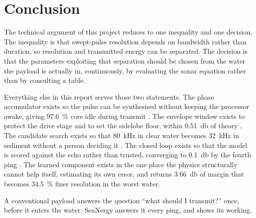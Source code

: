 \documentclass[conference,a4paper]{IEEEtran}
\begin{document}
\section{Conclusion}

The technical argument of this project reduces to one inequality and one
decision. The inequality is that swept-pulse resolution depends on bandwidth
rather than duration, so resolution and transmitted energy can be separated. The
decision is that the parameters exploiting that separation should be chosen from
the water the payload is actually in, continuously, by evaluating the sonar
equation rather than by consulting a table.

Everything else in this report serves those two statements. The phase
accumulator exists so the pulse can be synthesised without keeping the processor
awake, giving \SI{97.6}{\percent} core idle during transmit . The
envelope window exists to protect the drive stage and to set the sidelobe floor,
within \SI{0.51}{\decibel} of theory . The candidate search exists so
that \SI{80}{\kilo\hertz} in clear water becomes \SI{32}{\kilo\hertz} in
sediment without a person deciding it . The closed loop exists so that
the model is scored against the echo rather than trusted, converging to
\SI{0.1}{\decibel} by the fourth ping . The learned component exists
in the one place the physics structurally cannot help itself, estimating its own
error, and returns \SI{3.66}{\decibel} of margin that becomes
\SI{34.5}{\percent} finer resolution in the worst water.

A conventional payload answers the question ``what should I transmit?'' once,
before it enters the water. SeaNergy answers it every ping, and shows its
working.
\end{document}
